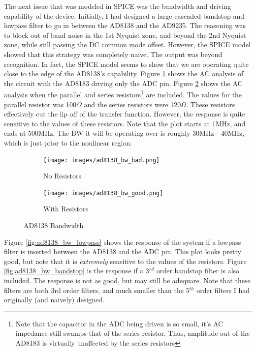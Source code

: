 \documentclass[a4paper, 12pt]{article}
\begin{document}
The next issue that was modeled in SPICE was the bandwidth and driving capability of the device.  Initially, I had designed a large cascaded bandstop and lowpass filter to go in between the AD8138 and the AD9235.  The reasoning was to block out of band noise in the 1st Nyquist zone, and beyond the 2nd Nyquist zone, while still passing the DC common mode offset.  However, the SPICE model showed that this strategy was completely naive.  The output was beyond recognition.  In fact, the SPICE model seems to show that we are operating quite close to the edge of the AD8138's capability.  Figure \ref{fig:ad8138_bw_bad} shows the AC analysis of the circuit with the AD8183 driving only the ADC pin.  Figure \ref{fig:ad8138_bw_good} shows the AC analysis when the parallel and series resistors\footnote{Note that the capacitor in the ADC being driven is so small, it's AC impedance still swamps that of the series resistor.  Thus, amplitude out of the AD8183 is virtually unaffected by the series resistors} are included.  The values for the parallel resistor was 100$\Omega$ and the series resistors were 120$\Omega$.  These resistors effectively cut the lip off of the transfer function.  However, the response is quite sensitive to the values of these resistors.  Note that the plot starts at 1MHz, and ends at 500MHz.  The BW it will be operating over is roughly 30MHz - 40MHz, which is just prior to the nonlinear region.

\begin{figure}[ht]
\centering
\begin{subfigure}[b]{0.45\textwidth}
  \texttt{[image: images/ad8138\_bw\_bad.png]}
  \caption{No Resistors}
  \label{fig:ad8138_bw_bad}
\end{subfigure}
\begin{subfigure}[b]{0.45\textwidth}  
  \texttt{[image: images/ad8138\_bw\_good.png]}
  \caption{With Resistors}
  \label{fig:ad8138_bw_good}
\end{subfigure}

\caption{AD8138 Bandwidth}
\label{fig:ad8138_bw}
\end{figure}

Figure \ref{fig:ad8138_bw_lowpass} shows the response of the system if a lowpass filter is inserted between the AD8138 and the ADC pin.  This plot looks pretty good, but note that it is \textit{extremely} sensitive to the values of the resistors.  Figure \ref{fig:ad8138_bw_bandstop} is the response if a 3$^{rd}$ order bandstop filter is also included.  The response is not as good, but may still be adequare.  Note that these filters are both 3rd order filters, and much smaller than the 5$^{th}$ order filters I had originally (and naively) designed.
\end{document}
